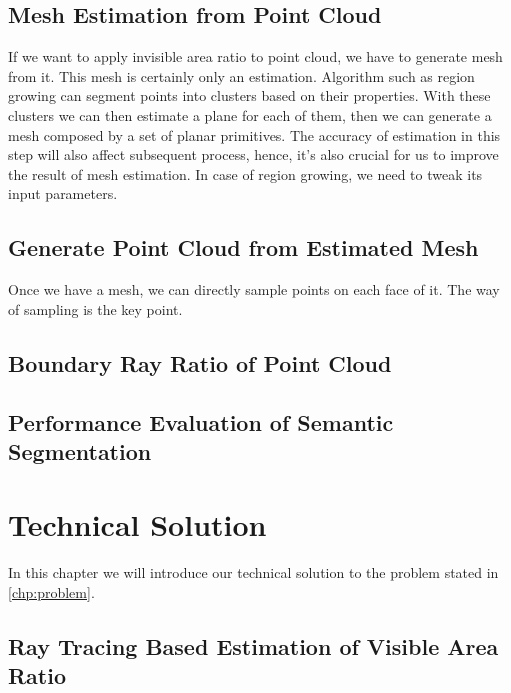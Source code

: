 \documentclass[11pt, a4paper,oneside,chapterprefix=false]{scrbook}
\begin{document}
\section{Mesh Estimation from Point Cloud} \label{mesh estimation of point cloud}

If we want to apply invisible area ratio to point cloud, we have to generate mesh from it. This mesh is certainly only an estimation. Algorithm such as region growing can segment points into clusters based on their properties. With these clusters we can then estimate a plane for each of them, then we can generate a mesh composed by a set of planar primitives. The accuracy of estimation in this step will also affect subsequent process, hence, it's also crucial for us to improve the result of mesh estimation. In case of region growing, we need to tweak its input parameters.

\section{Generate Point Cloud from Estimated Mesh} \label{generate point cloud from estimated mesh}

Once we have a mesh, we can directly sample points on each face of it. The way of sampling is the key point. 


\section{Boundary Ray Ratio of Point Cloud}



\section{Performance Evaluation of Semantic Segmentation} \label{sec:performance evaluation}



\chapter{Technical Solution} \label{chp:solution}

In this chapter we will introduce our technical solution to the problem stated in \ref{chp:problem}.

\section{Ray Tracing Based Estimation of Visible Area Ratio} \label{sec:ray tracing visible area ratio}
\end{document}
